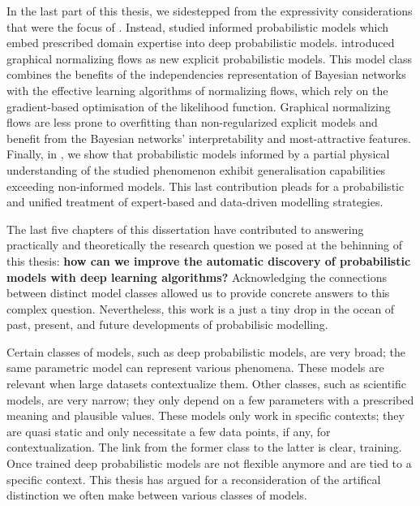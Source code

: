 In the last part of this thesis, we sidestepped from the expressivity considerations that were the focus of . Instead,  studied informed probabilistic models which embed prescribed domain expertise into deep probabilistic models.  introduced graphical normalizing flows as new explicit probabilistic models. This model class combines the benefits of the independencies representation of Bayesian networks with the effective learning algorithms of normalizing flows, which rely on the gradient-based optimisation of the likelihood function. Graphical normalizing flows are less prone to overfitting than non-regularized explicit models and benefit from the Bayesian networks' interpretability and most-attractive features. Finally, in , we show that probabilistic models informed by a partial physical understanding of the studied phenomenon exhibit generalisation capabilities exceeding non-informed models. This last contribution pleads for a probabilistic and unified treatment of expert-based and data-driven modelling strategies.

The last five chapters of this dissertation have contributed to answering practically and theoretically the research question we posed at the behinning of this thesis: \textbf{how can we improve the automatic discovery of probabilistic models with deep learning algorithms?} Acknowledging the connections between distinct model classes allowed us to provide concrete answers to this complex question. Nevertheless, this work is a just a tiny drop in the ocean of past, present, and future developments of probabilisic modelling.

Certain classes of models, such as deep probabilistic models, are very broad; the same parametric model can represent various phenomena. These models are relevant when large datasets contextualize them. Other classes, such as scientific models, are very narrow; they only depend on a few parameters with a prescribed meaning and plausible values. These models only work in specific contexts; they are quasi static and only necessitate a few data points, if any, for contextualization. The link from the former class to the latter is clear, training. Once trained deep probabilistic models are not flexible anymore and are tied to a specific context. This thesis has argued for a reconsideration of the artifical distinction we often make between various classes of models.

